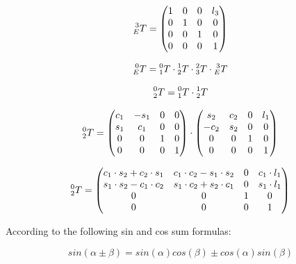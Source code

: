\begin{equation}
   \prescript{3}{E}{T} = \begin{pmatrix} 
  1 & 0 & 0 & l_3\\
   0 & 1 & 0& 0\\
   0& 0 & 1 &  0       \\
   0 & 0 & 0 & 1\end{pmatrix}
   \label{eq:T34}
\end{equation}


\begin{equation}
   \prescript{0}{E}{T} = \prescript{0}{1}{T} \cdot \prescript{1}{2}{T} \cdot \prescript{2}{3}{T} \cdot \prescript{3}{E}{T}
   \label{eq:tsum}
\end{equation}

\begin{equation}
   \prescript{0}{2}{T} = \prescript{0}{1}{T} \cdot \prescript{1}{2}{T}
\end{equation}

\begin{equation}
   \prescript{0}{2}{T} =\begin{pmatrix} 
  c_1 & -s_1 & 0 & 0\\
   s_1 & c_1 & 0& 0\\
   0& 0 & 1 &  0       \\
   0 & 0 & 0 & 1\end{pmatrix} \cdot \begin{pmatrix} 
  s_2 & c_2 & 0 & l_1\\
   -c_2 & s_2 & 0& 0\\
   0& 0 & 1 &  0       \\
   0 & 0 & 0 & 1\end{pmatrix} 
   \label{eq:tsum}
\end{equation}

\begin{equation}
   \prescript{0}{2}{T} = \begin{pmatrix} 
  c_1 \cdot s_2 + c_2  \cdot s_1 & c_1 \cdot c_2 -s_1 \cdot s_2 & 0 & c_1 \cdot l_1\\
   s_1 \cdot s_2 - c_1 \cdot c_2 &  s_1 \cdot c_2 + s_2 \cdot c_1 & 0& s_1 \cdot l_1\\
   0& 0 & 1 &  0       \\
   0 & 0 & 0 & 1\end{pmatrix}
\end{equation}

According to the following sin and cos sum formulas: 

\begin{equation}
  sin(\alpha \pm \beta)= sin(\alpha) cos(\beta) \pm cos(\alpha)sin(\beta)
\end{equation}


